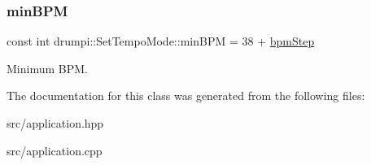 \subsubsection{\texorpdfstring{min\+B\+PM}{minBPM}}
{\footnotesize\ttfamily const int drumpi\+::\+Set\+Tempo\+Mode\+::min\+B\+PM = 38 + \hyperlink{classdrumpi_1_1SetTempoMode_acfb74b197bfd795f732b6d9684848af0}{bpm\+Step}\hspace{0.3cm}{\ttfamily [private]}}

Minimum B\+PM. 

The documentation for this class was generated from the following files\+:\begin{DoxyCompactItemize}
\item 
src/application.\+hpp\item 
src/application.\+cpp\end{DoxyCompactItemize}
